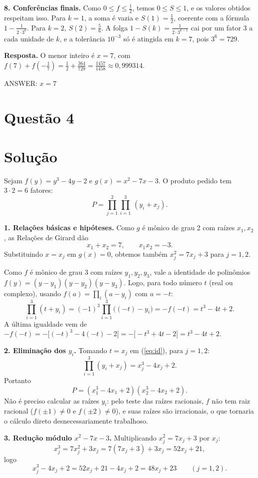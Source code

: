 \documentclass{article}%
\begin{document}
\textbf{8. Conferências finais.} Como $0\le f\le\frac12$, temos $0\le S\le 1$, e os valores obtidos respeitam isso. Para $k=1$, a soma é vazia e $S(1)=\frac12$, coerente com a fórmula $1-\frac{1}{2\cdot 3^0}$. Para $k=2$, $S(2)=\frac56$. A folga $1-S(k)=\frac{1}{2\cdot 3^{k-1}}$ cai por um fator $3$ a cada unidade de $k$, e a tolerância $10^{-3}$ só é atingida em $k=7$, pois $3^6=729$.

\textbf{Resposta.} O menor inteiro é $x=7$, com $f(7)+f\left(-\frac17\right)=\frac12+\frac{364}{729}=\frac{1457}{1458}\approx 0{,}999314$.

ANSWER: $x = 7$%
\newpage%
\section*{Questão 4}

\section*{Solução}

Sejam $f(y)=y^3-4y-2$ e $g(x)=x^2-7x-3$. O produto pedido tem $3\cdot 2=6$ fatores:
\[
P=\prod_{j=1}^{2}\prod_{i=1}^{3}\,(y_i+x_j).
\]

\textbf{1. Relações básicas e hipóteses.} Como $g$ é mônico de grau 2 com raízes $x_1,x_2$, as Relações de Girard dão
\[
x_1+x_2=7, \qquad x_1x_2=-3.
\]
Substituindo $x=x_j$ em $g(x)=0$, obtemos também $x_j^2=7x_j+3$ para $j=1,2$.

Como $f$ é mônico de grau 3 com raízes $y_1,y_2,y_3$, vale a identidade de polinômios $f(y)=(y-y_1)(y-y_2)(y-y_3)$. Logo, para todo número $t$ (real ou complexo), usando $f(a)=\prod_i (a-y_i)$ com $a=-t$:
\begin{equation}\label{eq:id}
\prod_{i=1}^{3}(t+y_i)=(-1)^3\prod_{i=1}^{3}\big((-t)-y_i\big)=-f(-t)=t^3-4t+2.
\end{equation}
A última igualdade vem de $-f(-t)=-\big[(-t)^3-4(-t)-2\big]=-\big[-t^3+4t-2\big]=t^3-4t+2$.

\textbf{2. Eliminação dos $y_i$.} Tomando $t=x_j$ em (\ref{eq:id}), para $j=1,2$:
\[
\prod_{i=1}^{3}(y_i+x_j)=x_j^3-4x_j+2.
\]
Portanto
\[
P=\left(x_1^3-4x_1+2\right)\left(x_2^3-4x_2+2\right).
\]
Não é preciso calcular as raízes $y_i$: pelo teste das raízes racionais, $f$ não tem raiz racional ($f(\pm1)\neq 0$ e $f(\pm2)\neq 0$), e suas raízes são irracionais, o que tornaria o cálculo direto desnecessariamente trabalhoso.

\textbf{3. Redução módulo $x^2-7x-3$.} Multiplicando $x_j^2=7x_j+3$ por $x_j$:
\[
x_j^3=7x_j^2+3x_j=7(7x_j+3)+3x_j=52x_j+21,
\]
logo
\[
x_j^3-4x_j+2=52x_j+21-4x_j+2=48x_j+23 \qquad (j=1,2).
\]
\end{document}
